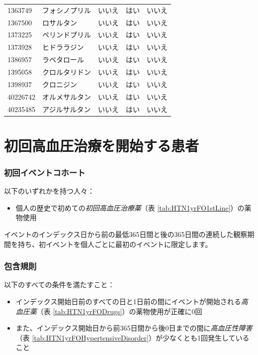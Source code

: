 \documentclass[
  11pt]{book}
\providecommand{\tightlist}{%
  \setlength{\itemsep}{0pt}\setlength{\parskip}{0pt}}
\theoremstyle{definition}
\theoremstyle{definition}
\theoremstyle{definition}
\theoremstyle{definition}
\theoremstyle{remark}
\begin{document}
\begin{longtable}[]{@{}lllll@{}}
1363749 & フォシノプリル & いいえ & はい & いいえ \\
1367500 & ロサルタン & いいえ & はい & いいえ \\
1373225 & ペリンドプリル & いいえ & はい & いいえ \\
1373928 & ヒドララジン & いいえ & はい & いいえ \\
1386957 & ラベタロール & いいえ & はい & いいえ \\
1395058 & クロルタリドン & いいえ & はい & いいえ \\
1398937 & クロニジン & いいえ & はい & いいえ \\
40226742 & オルメサルタン & いいえ & はい & いいえ \\
40235485 & アジルサルタン & いいえ & はい & いいえ \\
\end{longtable}

\section{初回高血圧治療を開始する患者}\label{HTN1yrFO}

\subsubsection*{初回イベントコホート}\label{ux521dux56deux30a4ux30d9ux30f3ux30c8ux30b3ux30dbux30fcux30c8}

以下のいずれかを持つ人々：

\begin{itemize}
\tightlist
\item
  個人の歴史で初めての\emph{初回高血圧治療薬}（表 \ref{tab:HTN1yrFO1stLine}）の薬物使用
\end{itemize}

イベントのインデックス日から前の最低365日間と後の365日間の連続した観察期間を持ち、初イベントを個人ごとに最初のイベントに限定します。

\subsubsection*{包含規則}\label{ux5305ux542bux898fux5247-1}

以下のすべての条件を満たすこと：

\begin{itemize}
\tightlist
\item
  インデックス開始日前のすべての日と1日前の間にイベントが開始される\emph{高血圧薬}（表 \ref{tab:HTN1yrFODrugs}）の薬物使用が正確に0回
\item
  また、インデックス開始日から前365日間から後0日までの間に\emph{高血圧性障害}（表 \ref{tab:HTN1yrFOHypertensiveDisorder}）が少なくとも1回発生していること
\end{itemize}
\end{document}
